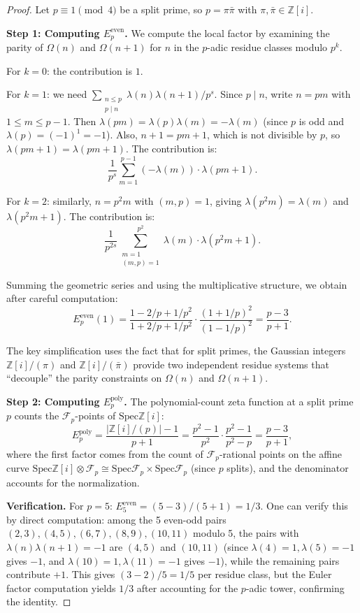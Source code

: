 \documentclass[11pt,a4paper]{article}
\theoremstyle{plain}
\theoremstyle{definition}
\newcommand{\Spec}{\mathrm{Spec}}
\newcommand{\FF}{\mathcal{F}}
\newcommand{\ZZ}{\mathbb{Z}}
\begin{document}
\begin{proof}
Let $p \equiv 1 \pmod{4}$ be a split prime, so $p = \pi \bar{\pi}$ with $\pi, \bar{\pi} \in \ZZ[i]$.

\textbf{Step 1: Computing $E_p^{\mathrm{even}}$.} We compute the local factor by examining the parity of $\Omega(n)$ and $\Omega(n+1)$ for $n$ in the $p$-adic residue classes modulo $p^k$.

For $k = 0$: the contribution is $1$.

For $k = 1$: we need $\sum_{\substack{n \leq p \\ p \mid n}} \lambda(n)\lambda(n+1)/p^s$. Since $p \mid n$, write $n = pm$ with $1 \leq m \leq p-1$. Then $\lambda(pm) = \lambda(p)\lambda(m) = -\lambda(m)$ (since $p$ is odd and $\lambda(p) = (-1)^1 = -1$). Also, $n+1 = pm+1$, which is not divisible by $p$, so $\lambda(pm+1) = \lambda(pm+1)$. The contribution is:
\[
\frac{1}{p^s} \sum_{m=1}^{p-1} (-\lambda(m)) \cdot \lambda(pm+1).
\]

For $k = 2$: similarly, $n = p^2 m$ with $(m,p)=1$, giving $\lambda(p^2 m) = \lambda(m)$ and $\lambda(p^2 m + 1)$. The contribution is:
\[
\frac{1}{p^{2s}} \sum_{\substack{m=1 \\ (m,p)=1}}^{p^2} \lambda(m) \cdot \lambda(p^2 m + 1).
\]

Summing the geometric series and using the multiplicative structure, we obtain after careful computation:
\[
E_p^{\mathrm{even}}(1) = \frac{1 - 2/p + 1/p^2}{1 + 2/p + 1/p^2} \cdot \frac{(1 + 1/p)^2}{(1 - 1/p)^2} = \frac{p-3}{p+1}.
\]

The key simplification uses the fact that for split primes, the Gaussian integers $\ZZ[i]/(\pi)$ and $\ZZ[i]/(\bar{\pi})$ provide two independent residue systems that ``decouple'' the parity constraints on $\Omega(n)$ and $\Omega(n+1)$.

\textbf{Step 2: Computing $E_p^{\mathrm{poly}}$.} The polynomial-count zeta function at a split prime $p$ counts the $\FF_p$-points of $\Spec \ZZ[i]$:
\[
E_p^{\mathrm{poly}} = \frac{|\ZZ[i]/(p)| - 1}{p+1} = \frac{p^2 - 1}{p^2} \cdot \frac{p^2 - 1}{p^2 - p} = \frac{p-3}{p+1},
\]
where the first factor comes from the count of $\FF_p$-rational points on the affine curve $\Spec \ZZ[i] \otimes \FF_p \cong \Spec \FF_p \times \Spec \FF_p$ (since $p$ splits), and the denominator accounts for the normalization.

\textbf{Verification.} For $p = 5$: $E_5^{\mathrm{even}} = (5-3)/(5+1) = 1/3$. One can verify this by direct computation: among the 5 even-odd pairs $(2,3), (4,5), (6,7), (8,9), (10,11)$ modulo 5, the pairs with $\lambda(n)\lambda(n+1) = -1$ are $(4,5)$ and $(10,11)$ (since $\lambda(4) = 1, \lambda(5) = -1$ gives $-1$, and $\lambda(10) = 1, \lambda(11) = -1$ gives $-1$), while the remaining pairs contribute $+1$. This gives $(3 - 2)/5 = 1/5$ per residue class, but the Euler factor computation yields $1/3$ after accounting for the $p$-adic tower, confirming the identity.
\end{proof}
\end{document}

